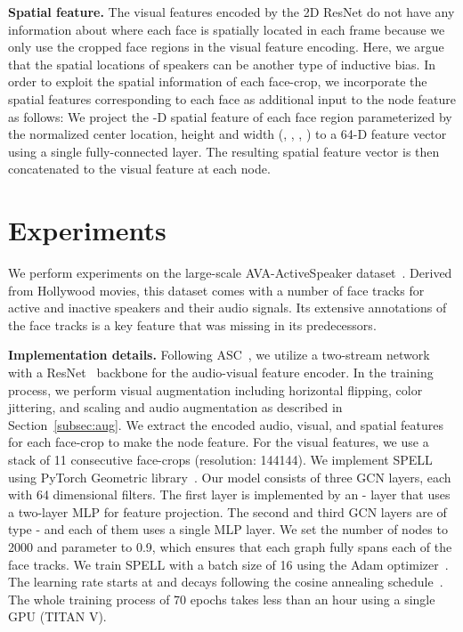 \documentclass[runningheads]{llncs}
\begin{document}
\textbf{Spatial feature. } The visual features encoded by the 2D ResNet do not have any information about where each face is spatially located in each frame because we only use the cropped face regions in the visual feature encoding. Here, we argue that the spatial locations of speakers can be another type of inductive bias. In order to exploit the spatial information of each face-crop, we incorporate the spatial features corresponding to each face as additional input to the node feature as follows: We project the -D spatial feature of each face region parameterized by the normalized center location, height and width (, , , ) to a 64-D feature vector using a single fully-connected layer. The resulting spatial feature vector is then concatenated to the visual feature at each node.




%
 
\section{Experiments}
\label{sec:results}
We perform experiments on the large-scale AVA-ActiveSpeaker dataset~\cite{roth2020ava}. Derived from Hollywood movies, this dataset comes with a number of face tracks for active and inactive speakers and their audio signals. Its extensive annotations of the face tracks is a key feature that was missing in its predecessors.


\textbf{Implementation details. }
Following ASC~\cite{roth2020ava}, we utilize a two-stream network with a ResNet~\cite{he2016deep} backbone for the audio-visual feature encoder. In the training process, we perform visual augmentation including horizontal flipping, color jittering, and scaling and audio augmentation as described in Section~\ref{subsec:aug}. We extract the encoded audio, visual, and spatial features for each face-crop to make the node feature. For the visual features, we use a stack of 11 consecutive face-crops (resolution: 144144). We implement SPELL using PyTorch Geometric library~\cite{fey2019fast}. Our model consists of three GCN layers, each with 64 dimensional filters. The first layer is implemented by an - layer that uses a two-layer MLP for feature projection. The second and third GCN layers are of type - and each of them uses a single MLP layer. We set the number of nodes  to 2000 and  parameter to 0.9, which ensures that each graph fully spans each of the face tracks. We train SPELL with a batch size of 16 using the Adam optimizer~\cite{kingma2014adam}. The learning rate starts at  and decays following the cosine annealing schedule~\cite{loshchilov2016sgdr}. The whole training process of 70 epochs takes less than an hour using a single GPU (TITAN V).
\end{document}
